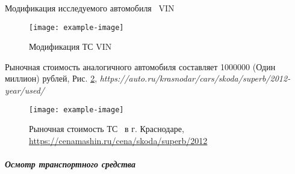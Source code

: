 %    
%    
%    

\vspace{3mm}

Модификация исследуемого автомобиля  \,   VIN  \vin \, 


\begin{figure}[H]
	\centering
	\texttt{[image: example-image]}
	\caption{{\footnotesize {Модификация ТС  VIN \vin  }}}
	\label{ris:images/модель}
\end{figure}

Рыночная стоимость аналогичного автомобиля составляет 1000000 (Один миллион) рублей, Рис. \ref{ris:images/цена}, 
\textit{ https://auto.ru/krasnodar/cars/skoda/superb/2012-year/used/}
\vspace{3mm}
  \begin{figure}[H]
	\centering
	\texttt{[image: example-image]}
	\caption{{\footnotesize {Рыночная стоимость ТС  \,  в г. Краснодаре, \url{https://cenamashin.ru/cena/skoda/superb/2012}}}}
	\label{ris:images/цена}
\end{figure}




\relax
%
\subparagraph{Осмотр транспортного средства }


